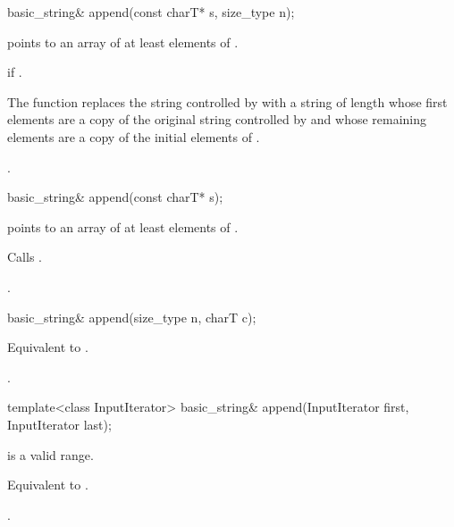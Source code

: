 %
\begin{itemdecl}
basic_string&
  append(const charT* s, size_type n);
\end{itemdecl}

\begin{itemdescr}
\pnum
\requires {} points to an array of at least  elements
of .

\pnum
\throws {} if .

\pnum
\effects The function replaces the string controlled by 
with a string of length  whose first 
elements are a copy of the original string controlled by 
and whose remaining elements are a copy of the initial  elements
of .

\pnum
\returns
{}.
\end{itemdescr}

%
\begin{itemdecl}
basic_string& append(const charT* s);
\end{itemdecl}

\begin{itemdescr}
\pnum
\requires {} points to an array of at least 
elements of .

\pnum
\effects Calls .

\pnum
\returns
{}.
\end{itemdescr}

%
\begin{itemdecl}
basic_string& append(size_type n, charT c);
\end{itemdecl}

\begin{itemdescr}
\pnum
\effects Equivalent to .

\pnum
\returns
{}.
\end{itemdescr}

%
\begin{itemdecl}
template<class InputIterator>
  basic_string& append(InputIterator first, InputIterator last);
\end{itemdecl}

\begin{itemdescr}
\pnum
\requires {} is a valid range.

\pnum
\effects Equivalent to .

\pnum
\returns
{}.
\end{itemdescr}

